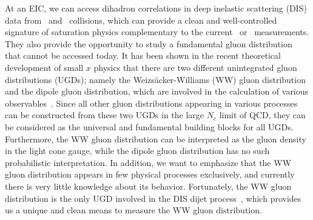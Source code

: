 At an EIC, we can access dihadron correlations in deep inelastic scattering
(DIS) data from \eA\ and \ep\ collisions, which can provide a clean and
well-controlled signature of saturation physics complementary to the current \dA\
or \pA\ measurements. They also provide the opportunity to study a fundamental
gluon distribution that cannot be accessed today. It has been shown in the
recent theoretical development of small $x$ physics that there are two different
unintegrated gluon distributions (UGDs); namely the Weizs\"{a}cker-Williams (WW)
gluon distribution and the dipole gluon distribution, which are involved in the
calculation of various observables~\cite{Dominguez:2010xd}. Since all other
gluon distributions appearing in various processes can be constructed from these
two UGDs in the large $N_c$ limit of QCD, they can be considered as the
universal and fundamental building blocks for all UGDs. Furthermore, the WW
gluon distribution can be interpreted as the gluon density in the light cone
gauge, while the dipole gluon distribution has no such probabilistic
interpretation. In addition, we want to emphasize that the WW gluon distribution
appears in few physical processes exclusively, and currently there is very
little knowledge about its behavior. Fortunately, the WW gluon distribution is
the only UGD involved in the DIS dijet process~\cite{Dominguez:2011wm}, which
provides us a unique and clean means to measure the WW gluon distribution.




